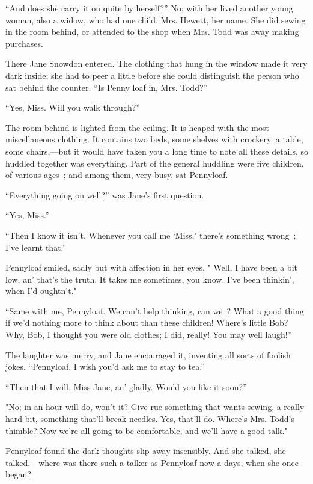 ``And does she carry it on quite by herself?'' No; with her lived
another young woman, also a widow, who had one child. Mrs. Hewett, her
name. She did sewing in the room behind, or attended to the shop when
Mrs. Todd was away making purchases.

There Jane Snowdon entered. The clothing that hung in the window made it
very dark inside; she had to peer a little before she could distinguish
the person who sat behind the counter. ``Is Penny loaf in, Mrs. Todd?''

``Yes, Miss. Will you walk through?''

The room behind is lighted from the ceiling. It is heaped with the most
miscellaneous clothing. It contains two beds, some shelves with
crockery, a table, some chairs,---but it would have taken you a long
time to note all these {\protect\hypertarget{301}{}{}} details, so
huddled together was everything. Part of the general huddling were five
children, of various ages~; and among them, very busy, sat Pennyloaf.

``Everything going on well?'' was Jane's first question.

``Yes, Miss.''

``Then I know it isn't. Whenever you call me `Miss,' there's something
wrong~; I've learnt that.''

Pennyloaf smiled, sadly but with affection in her eyes. " Well, I have
been a bit low, an' that's the truth. It takes me sometimes, you know.
I've been thinkin', when I'd oughtn't."

``Same with me, Pennyloaf. We can't help thinking, can we~? What a good
thing if we'd nothing more to think about than these children! Where's
little Bob? Why, Bob, I thought you were old clothes; I did, really! You
may well laugh!''

The laughter was merry, and Jane encouraged it, inventing all sorts of
foolish jokes. ``Pennyloaf, I wish you'd ask me to stay to tea.''

``Then that I will. Miss Jane, an' gladly. Would you like it soon?''

"No; in an hour will do, won't it? Give {\protect\hypertarget{302}{}{}}
rue something that wants sewing, a really hard bit, something that'll
break needles. Yes, that'll do. Where's Mrs. Todd's thimble? Now we're
all going to be comfortable, and we'll have a good talk."

Pennyloaf found the dark thoughts slip away insensibly. And she talked,
she talked,---where was there such a talker as Pennyloaf now-a-days,
when she once began?

